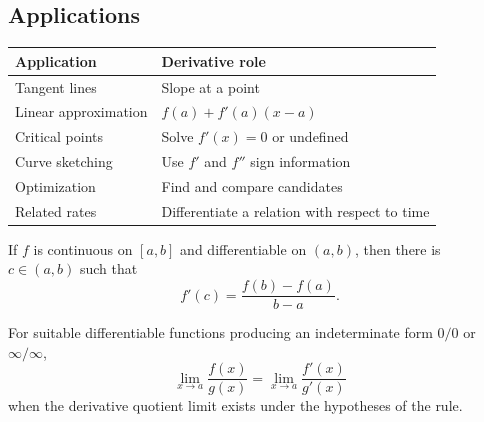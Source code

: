 \subsection*{Applications}

\begin{center}
\begin{tabular}{ll}
\toprule
Application & Derivative role \\
\midrule
Tangent lines & Slope at a point \\
Linear approximation & \(f(a)+f'(a)(x-a)\) \\
Critical points & Solve \(f'(x)=0\) or undefined \\
Curve sketching & Use \(f'\) and \(f''\) sign information \\
Optimization & Find and compare candidates \\
Related rates & Differentiate a relation with respect to time \\
\bottomrule
\end{tabular}
\end{center}

\begin{theorem*}
If \(f\) is continuous on \([a,b]\) and differentiable on \((a,b)\), then
there is \(c\in(a,b)\) such that
\[
  f'(c)=\frac{f(b)-f(a)}{b-a}.
\]
\end{theorem*}

\begin{theorem*}
For suitable differentiable functions producing an indeterminate form
\(0/0\) or \(\infty/\infty\),
\[
  \lim_{x\to a}\frac{f(x)}{g(x)}
  =
  \lim_{x\to a}\frac{f'(x)}{g'(x)}
\]
when the derivative quotient limit exists under the hypotheses of the rule.
\end{theorem*}
